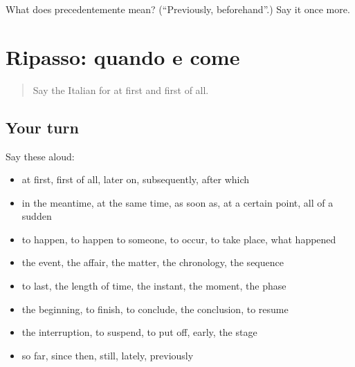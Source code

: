 \begin{tcolorbox}[breakable,colback=teal!4,colframe=teal!35!black,title={Before you move on}]
What does precedentemente mean? (\textquotedblleft{}Previously, beforehand\textquotedblright{}.) Say it once more.
\end{tcolorbox}
\section[(dialogue)]{Ripasso: quando e come}

\label{lesson:IT-R280-ripasso-273-280}



\begin{quote}
Say the Italian for at first and first of all.
\end{quote}

\subsection*{Your turn}
Say these aloud:

\begin{itemize}
\raggedright
  \item at first, first of all, later on, subsequently, after which
  \item in the meantime, at the same time, as soon as, at a certain point, all of a sudden
  \item to happen, to happen to someone, to occur, to take place, what happened
  \item the event, the affair, the matter, the chronology, the sequence
  \item to last, the length of time, the instant, the moment, the phase
  \item the beginning, to finish, to conclude, the conclusion, to resume
  \item the interruption, to suspend, to put off, early, the stage
  \item so far, since then, still, lately, previously
\end{itemize}

